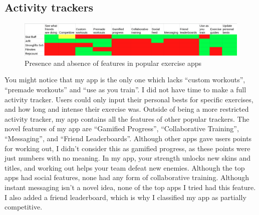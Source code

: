 \documentclass{l4proj}
\begin{document}
\subsection{Activity trackers}
\begin{figure}[H]
    \centering
    \includegraphics[width=1.0\linewidth]{exercise_comparisons.png}    
    \caption{Presence and absence of features in popular exercise apps}
    \label{fig:exercises} 
\end{figure}
You might notice that my app is the only one which lacks ``custom workouts'', ``premade workouts'' and ``use as you train''. I did not have time to make a full activity tracker. Users could only input their personal bests for specific exercises, and how long and intense their exercise was.
Outside of being a more restricted activity tracker, my app contains all the features of other popular trackers. The novel features of my app are ``Gamified Progress'', ``Collaborative Training'', ``Messaging'', and ``Friend Leaderboards''. Although other apps gave users points for working out, I didn't consider this as gamified progress, as these points were just numbers with no meaning. In my app, your strength unlocks new skins and titles, and working out helps your team defeat new enemies. Although the top apps had social features, none had any form of collaborative training. Although instant messaging isn't a novel idea, none of the top apps I tried had this feature. I also added a friend leaderboard, which is why I classified my app as partially competitive.
\end{document}
